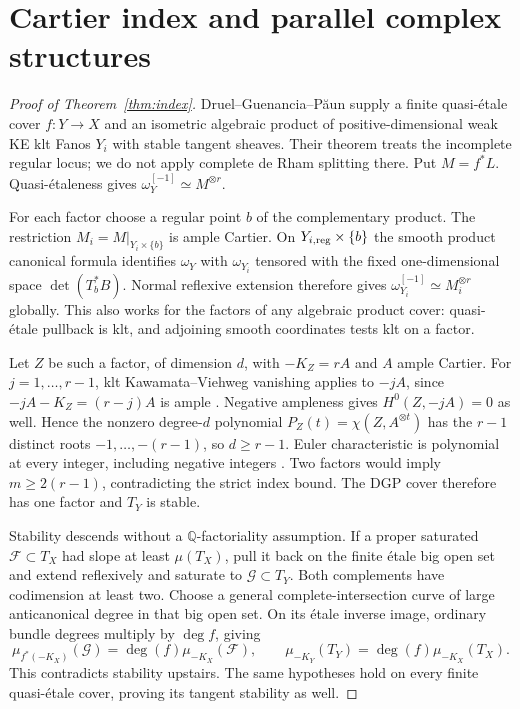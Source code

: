 \documentclass[11pt]{article}
\newcommand{\Q}{\mathbb Q}
\begin{document}
\section{Cartier index and parallel complex structures}
\begin{proof}[Proof of Theorem~\ref{thm:index}]
Druel--Guenancia--P\u aun \cite[Theorem A]{DGP} supply a finite quasi-\'etale
cover $f:Y\to X$ and an isometric algebraic product of positive-dimensional
weak KE klt Fanos $Y_i$ with stable tangent sheaves. Their theorem treats
the incomplete regular locus; we do not apply complete de Rham splitting
there. Put $M=f^*L$. Quasi-\'etaleness gives
$\omega_Y^{[-1]}\simeq M^{\otimes r}$.

For each factor choose a regular point $b$ of the complementary product.
The restriction $M_i=M|_{Y_i\times\{b\}}$ is ample Cartier. On
$Y_{i,\rm reg}\times\{b\}$ the smooth product canonical formula identifies
$\omega_Y$ with $\omega_{Y_i}$ tensored with the fixed one-dimensional
space $\det(T_b^*B)$. Normal reflexive extension therefore gives
$\omega_{Y_i}^{[-1]}\simeq M_i^{\otimes r}$ globally. This also works for
the factors of any algebraic product cover: quasi-\'etale pullback is klt,
and adjoining smooth coordinates tests klt on a factor.

Let $Z$ be such a factor, of dimension $d$, with $-K_Z=rA$ and $A$
ample Cartier. For $j=1,\ldots,r-1$, klt Kawamata--Viehweg vanishing
applies to $-jA$, since $-jA-K_Z=(r-j)A$ is ample
\cite[Theorem 2.22]{KV}.
Negative ampleness gives $H^0(Z,-jA)=0$ as well. Hence the nonzero
degree-$d$ polynomial $P_Z(t)=\chi(Z,A^{\otimes t})$ has the $r-1$
distinct roots $-1,\ldots,-(r-1)$, so $d\geq r-1$.
Euler characteristic is polynomial at every integer, including negative
integers \cite[Lemma 33.45.1]{Stacks}. Two factors would imply
$m\geq2(r-1)$, contradicting the strict index bound. The DGP cover
therefore has one factor and $T_Y$ is stable.

Stability descends without a $\Q$-factoriality assumption. If a proper
saturated $\mathcal F\subset T_X$ had slope at least $\mu(T_X)$, pull it
back on the finite \'etale big open set and extend reflexively and
saturate to $\mathcal G\subset T_Y$. Both complements have codimension at
least two. Choose a general complete-intersection curve of large
anticanonical degree in that big open set. On its \'etale inverse image,
ordinary bundle degrees multiply by $\deg f$, giving
\[
\mu_{f^*(-K_X)}(\mathcal G)
=\deg(f)\mu_{-K_X}(\mathcal F),\qquad
\mu_{-K_Y}(T_Y)=\deg(f)\mu_{-K_X}(T_X).
\]
This contradicts stability upstairs. The same hypotheses hold on every
finite quasi-\'etale cover, proving its tangent stability as well.


\end{proof}
\end{document}

